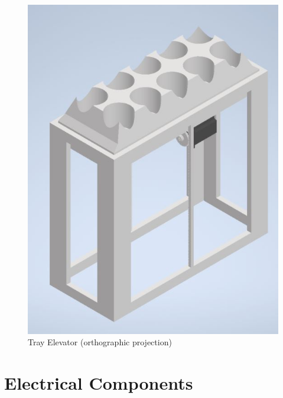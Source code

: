 \documentclass[12pt, titlepage]{article}
\begin{document}
\begin{figure}[H]
  \centering
  \includegraphics{Tray_Elevator2.jpg}
  \caption{Tray Elevator (orthographic projection)}
  \label{fig:elevator2}
\end{figure}

\section{Electrical Components}
\end{document}
